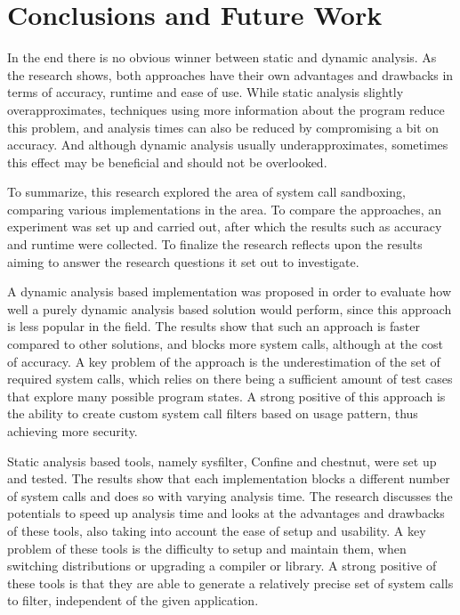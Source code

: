 \section{Conclusions and Future Work}
\label{sec:conclusion}
In the end there is no obvious winner between static and dynamic analysis.
As the research shows, both approaches have their own advantages and drawbacks in terms of accuracy, runtime and ease of use.
While static analysis slightly overapproximates, techniques using more information about the program reduce this problem, and analysis times can also be reduced by compromising a bit on accuracy.
And although dynamic analysis usually underapproximates, sometimes this effect may be beneficial and should not be overlooked.

To summarize, this research explored the area of system call sandboxing, comparing various implementations in the area. To compare the approaches, an experiment was set up and carried out, after which the results such as accuracy and runtime were collected. To finalize the research reflects upon the results aiming to answer the research questions it set out to investigate.

A dynamic analysis based implementation was proposed in order to evaluate how well a purely dynamic analysis based solution would perform, since this approach is less popular in the field.
The results show that such an approach is faster compared to other solutions, and blocks more system calls, although at the cost of accuracy.
A key problem of the approach is the underestimation of the set of required system calls, which relies on there being a sufficient amount of test cases that explore many possible program states.
A strong positive of this approach is the ability to create custom system call filters based on usage pattern, thus achieving more security.

Static analysis based tools, namely sysfilter, Confine and chestnut, were set up and tested.
The results show that each implementation blocks a different number of system calls and does so with varying analysis time.
The research discusses the potentials to speed up analysis time and looks at the advantages and drawbacks of these tools, also taking into account the ease of setup and usability.
A key problem of these tools is the difficulty to setup and maintain them, when switching distributions or upgrading a compiler or library.
A strong positive of these tools is that they are able to generate a relatively precise set of system calls to filter, independent of the given application.

